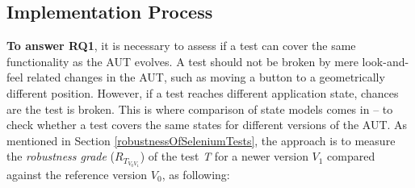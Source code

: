 \subsection{Implementation Process}
\label{toolimplementation}

\textbf{To answer RQ1}, it is necessary to assess if a test can cover the same functionality as the AUT evolves. A test should not be broken by mere look-and-feel related changes in the AUT, such as moving a button to a geometrically different position. However, if a test reaches different application state, chances are the test is broken. This is where comparison of state models comes in -- to check whether a test covers the same states for different versions of the AUT. As mentioned in Section \ref{robustnessOfSeleniumTests}, the approach is to measure the  \textit{robustness grade} ($R_{T_{V_{0}V_{1}}}$) of the test \textit{T} for a newer version \textit{$V_{1}$} compared against the reference version \textit{$V_{0}$}, as following:
